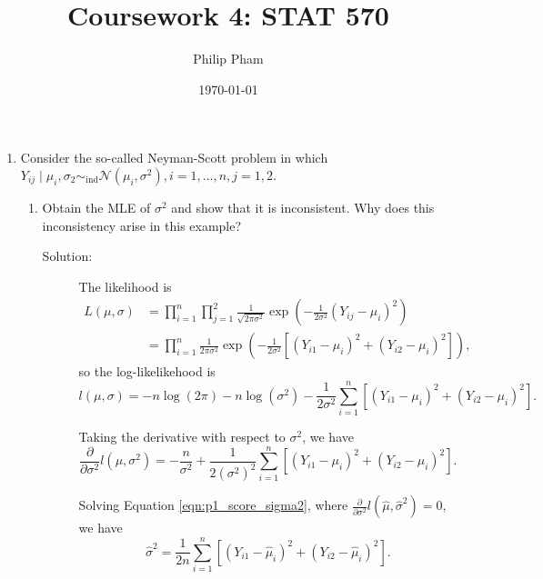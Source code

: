 \documentclass[letterpaper,11pt]{article}
\title{Coursework 4: STAT 570}
\author{Philip Pham}
\date{\today}
\begin{document}
\maketitle

\begin{enumerate}
\item Consider the so-called Neyman-Scott problem in which
  $Y_{ij}\mid \mu_i,\sigma_2 \sim_{\mathrm{ind}}
  \mathcal{N}\left(\mu_i,\sigma^2\right), i=1,\ldots,n,j=1,2.$
  \begin{enumerate}
  \item Obtain the MLE of $\sigma^2$ and show that it is inconsistent. Why does
    this inconsistency arise in this example?

    \begin{description}
    \item[Solution:] The likelihood is
      \begin{align}
        L\left(\mu,\sigma\right)
        &= \prod_{i=1}^n \prod_{j=1}^2 \frac{1}{\sqrt{2\pi\sigma^2}}\exp\left(
          -\frac{1}{2\sigma^2}\left(Y_{ij} - \mu_i\right)^2
          \right) \nonumber\\
        &= \prod_{i=1}^n \frac{1}{2\pi\sigma^2}\exp\left(
          -\frac{1}{2\sigma^2}\left[
          \left(Y_{i1} - \mu_i\right)^2
          +\left(Y_{i2} - \mu_i\right)^2
          \right]
          \right),
      \end{align}
      so the log-likelikehood is
      \begin{equation}
        l\left(\mu,\sigma\right) = -n\log\left(2\pi\right) -n\log\left(\sigma^2\right)
        - \frac{1}{2\sigma^2}\sum_{i=1}^n\left[
          \left(Y_{i1} - \mu_i\right)^2
          +\left(Y_{i2} - \mu_i\right)^2\right].
        \label{eqn:p1_log_likelihood}
      \end{equation}

      Taking the derivative with respect to $\sigma^2$, we have
      \begin{equation}
        \frac{\partial}{\partial\sigma^2}l\left(\mu, \sigma^2\right)
          = -\frac{n}{\sigma^2} +
          \frac{1}{2\left(\sigma^2\right)^2}\sum_{i=1}^n
          \left[
            \left(Y_{i1} - \mu_i\right)^2 +
            \left(Y_{i2} - \mu_i\right)^2\right].
          \label{eqn:p1_score_sigma2}
        \end{equation}

        Solving Equation \ref{eqn:p1_score_sigma2}, where
        $\frac{\partial}{\partial\sigma^2}l\left(\hat{\mu},
          \hat{\sigma}^2\right) = 0$, we have
        \begin{equation}
          \hat{\sigma}^2 = \frac{1}{2n}\sum_{i=1}^n
          \left[
            \left(Y_{i1} - \hat{\mu}_i\right)^2 +
            \left(Y_{i2} - \hat{\mu}_i\right)^2\right].
          \label{eqn:p1_sigma_hat}
        \end{equation}


\end{description}
\end{enumerate}
\end{enumerate}
\end{document}

